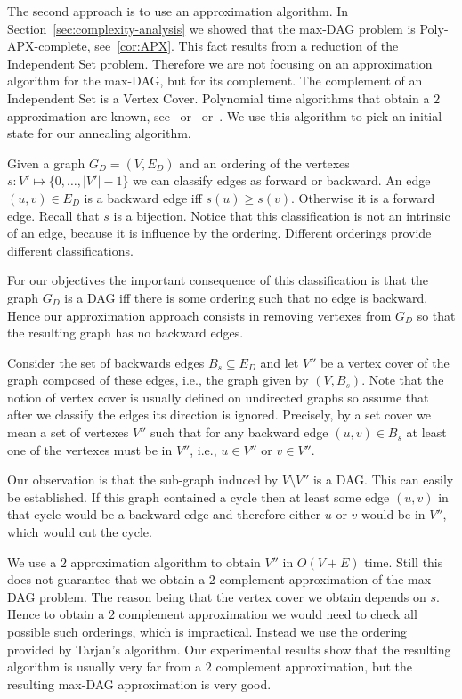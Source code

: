 \documentclass[a4paper]{article}
\begin{document}
The second approach is to use an approximation algorithm. In
Section~\ref{sec:complexity-analysis} we showed that the max-DAG problem is
Poly-APX-complete, see~\ref{cor:APX}. This fact results from a reduction of
the Independent Set problem. Therefore we are not focusing on an
approximation algorithm for the max-DAG, but for its complement. The
complement of an Independent Set is a Vertex Cover. Polynomial time
algorithms that obtain a $2$ approximation are known,
see~\citet*{cormen2009introduction} or~\citet*{garey1979computers}
or~\citet*{papadimitriou1998combinatorial}. We use this algorithm to
pick an initial state for our annealing algorithm.

Given a graph $G_D = (V, E_D)$ and an ordering of the vertexes
$s:V' \mapsto \{0, \ldots, |V'|-1\}$ we can classify edges as forward or
backward. An edge $(u, v) \in E_D$ is a backward edge iff $s(u) \geq
s(v)$. Otherwise it is a forward edge. Recall that $s$ is a
bijection. Notice that this classification is not an intrinsic of an edge,
because it is influence by the ordering. Different orderings provide
different classifications.

For our objectives the important consequence of this classification is that
the graph $G_D$ is a DAG iff there is some ordering such that no edge is
backward. Hence our approximation approach consists in removing vertexes
from $G_D$ so that the resulting graph has no backward edges.

Consider the set of backwards edges $B_s \subseteq E_D$ and let $V''$ be a
vertex cover of the graph composed of these edges, i.e., the graph given by
$(V, B_s)$. Note that the notion of vertex cover is usually defined on
undirected graphs so assume that after we classify the edges its direction
is ignored. Precisely, by a set cover we mean a set of vertexes $V''$ such
that for any backward edge $(u, v) \in B_s$ at least one of the vertexes
must be in $V''$, i.e., $u \in V''$ or $v \in V''$.

Our observation is that the sub-graph induced by $V \setminus V''$ is a
DAG. This can easily be established. If this graph contained a cycle then
at least some edge $(u,v)$ in that cycle would be a backward edge and
therefore either $u$ or $v$ would be in $V''$, which would cut the
cycle.

We use a $2$ approximation algorithm to obtain $V''$ in $O(V+E)$
time. Still this does not guarantee that we obtain a $2$ complement
approximation of the max-DAG problem. The reason being that the vertex
cover we obtain depends on $s$. Hence to obtain a $2$ complement
approximation we would need to check all possible such orderings, which is
impractical. Instead we use the ordering provided by Tarjan's
algorithm. Our experimental results show that the resulting algorithm is
usually very far from a $2$ complement approximation, but the resulting
max-DAG approximation is very good.
\end{document}
